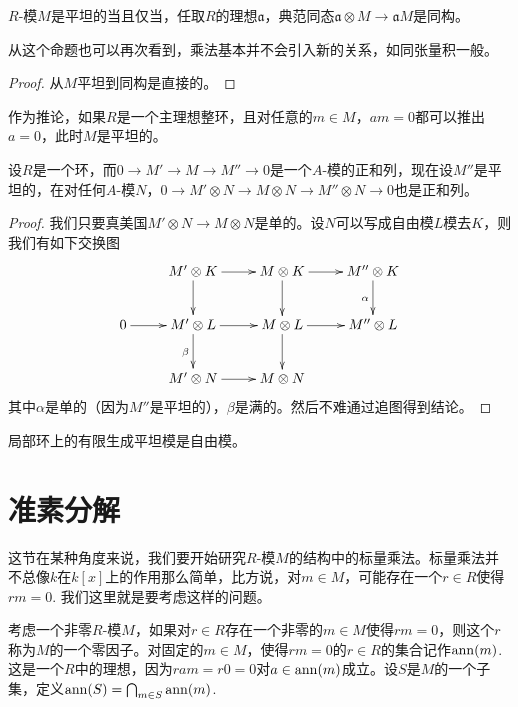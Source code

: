 \begin{pro}
	$R$-模$M$是平坦的当且仅当，任取$R$的理想$\mathfrak a$，典范同态$\mathfrak a\otimes M\to \mathfrak aM$是同构。
\end{pro}

从这个命题也可以再次看到，乘法基本并不会引入新的关系，如同张量积一般。

\begin{proof}
	从$M$平坦到同构是直接的。\notprove
\end{proof}

作为推论，如果$R$是一个主理想整环，且对任意的$m\in M$，$am=0$都可以推出$a=0$，此时$M$是平坦的。

\begin{pro}
	设$R$是一个环，而$0\to M'\to M\to M''\to 0$是一个$A$-模的正和列，现在设$M''$是平坦的，在对任何$A$-模$N$，$0\to M'\otimes N \to M\otimes N\to M''\otimes N\to 0$也是正和列。
\end{pro}

\begin{proof}
	我们只要真美国$M'\otimes N\to M\otimes N$是单的。设$N$可以写成自由模$L$模去$K$，则我们有如下交换图
	\[
		\xymatrix{
			& M'\otimes K \ar[r]\ar[d]& M\otimes K \ar[r]\ar[d]& M''\otimes K\ar[d]_{\alpha}\\
		0\ar[r]& M'\otimes L\ar[r]\ar[d]_\beta& M\otimes L\ar[r]\ar[d] & M''\otimes L\\
		& M'\otimes N \ar[r] & M\otimes N
		}
	\]
	其中$\alpha$是单的（因为$M''$是平坦的），$\beta$是满的。然后不难通过追图得到结论。
\end{proof}

\begin{pro}
	局部环上的有限生成平坦模是自由模。
\end{pro}

\section{准素分解}

这节在某种角度来说，我们要开始研究$R$-模$M$的结构中的标量乘法。标量乘法并不总像$k$在$k[x]$上的作用那么简单，比方说，对$m\in M$，可能存在一个$r\in R$使得$rm=0$. 我们这里就是要考虑这样的问题。

\para[零因子] 考虑一个非零$R$-模$M$，如果对$r\in R$存在一个非零的$m\in M$使得$rm=0$，则这个$r$称为$M$的一个零因子。对固定的$m\in M$，使得$rm=0$的$r\in R$的集合记作$\operatorname{ann}(m)$. 这是一个$R$中的理想，因为$ram=r0=0$对$a\in \operatorname{ann}(m)$成立。设$S$是$M$的一个子集，定义$\operatorname{ann}(S)=\bigcap_{m\in S}\operatorname{ann}(m)$.\endpara

